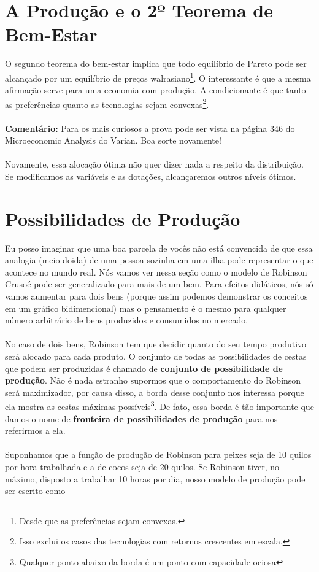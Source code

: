 \documentclass[a4paper,11pt,oneside]{book}
\theoremstyle{definition}
\theoremstyle{break}
\begin{document}
\section{A Produção e o 2º Teorema de Bem-Estar}

O segundo teorema do bem-estar implica que todo equilíbrio de Pareto pode ser alcançado por um equilíbrio de preços walrasiano\footnote{Desde que as preferências sejam convexas.}. O interessante é que a mesma afirmação serve para uma economia com produção. A condicionante é que tanto as preferências quanto as tecnologias sejam convexas\footnote{Isso exclui os casos das tecnologias com retornos crescentes em escala.}.
\\~\\
\textbf{Comentário:} Para os mais curiosos a prova pode ser vista na página 346 do Microeconomic Analysis do Varian. Boa sorte novamente!
\\~\\
Novamente, essa alocação ótima não quer dizer nada a respeito da distribuição. Se modificamos as variáveis e as dotações, alcançaremos outros níveis ótimos.

\section{Possibilidades de Produção}

Eu posso imaginar que uma boa parcela de vocês não está convencida de que essa analogia (meio doida) de uma pessoa sozinha em uma ilha pode representar o que acontece no mundo real. Nós vamos ver nessa seção como o modelo de Robinson Crusoé pode ser generalizado para mais de um bem. Para efeitos didáticos, nós só vamos aumentar para dois bens (porque assim podemos demonstrar os conceitos em um gráfico bidimencional) mas o pensamento é o mesmo para qualquer número arbitrário de bens produzidos e consumidos no mercado.
\\~\\
No caso de dois bens, Robinson tem que decidir quanto do seu tempo produtivo será alocado para cada produto. O conjunto de todas as possibilidades de cestas que podem ser produzidas é chamado de \textbf{conjunto de possibilidade de produção}. Não é nada estranho supormos que o comportamento do Robinson será maximizador, por causa disso, a borda desse conjunto nos interessa porque ela mostra as cestas máximas possíveis\footnote{Qualquer ponto abaixo da borda é um ponto com capacidade ociosa}. De fato, essa borda é tão importante que damos o nome de \textbf{fronteira de possibilidades de produção} para nos referirmos a ela.
\\~\\
Suponhamos que a função de produção de Robinson para peixes seja de 10 quilos por hora trabalhada e a de cocos seja de 20 quilos. Se Robinson tiver, no máximo, disposto a trabalhar 10 horas por dia, nosso modelo de produção pode ser escrito como
\end{document}
